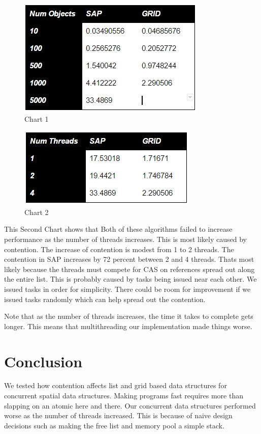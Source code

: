 \documentclass[conference]{IEEEtran}
\begin{document}
\begin{figure}[!h]
\centering
\includegraphics[scale=0.9]{table1}
\caption{Chart 1}
\label{fig_sim}
\end{figure}

\begin{figure}[!h]
\centering
\includegraphics[scale=0.9]{table2}
\caption{Chart 2}
\label{fig_sim}
\end{figure}


This Second Chart shows that Both of these algorithms failed to increase performance as the number of threads increases. This is most likely caused by contention. The increase of contention is modest from 1 to 2 threads. The contention in SAP increases by 72 percent between 2 and 4 threads. That\textquotesingle s most likely because the threads must compete for CAS on references spread out along the entire list. This is probably caused by tasks being issued near each other. We issued tasks in order for simplicity. There could be room for improvement if we issued tasks randomly which can help spread out the contention.

Note that as the number of threads increases, the time it takes to complete gets longer. This means that multithreading our implementation made things worse.



\section{Conclusion}
We tested how contention affects list and grid based data structures for concurrent spatial data structures. Making programs fast requires more than slapping on an atomic here and there. Our concurrent data structures performed worse as the number of threads increased. This is because of naive design decisions such as making the free list and memory pool a simple stack.
\end{document}
